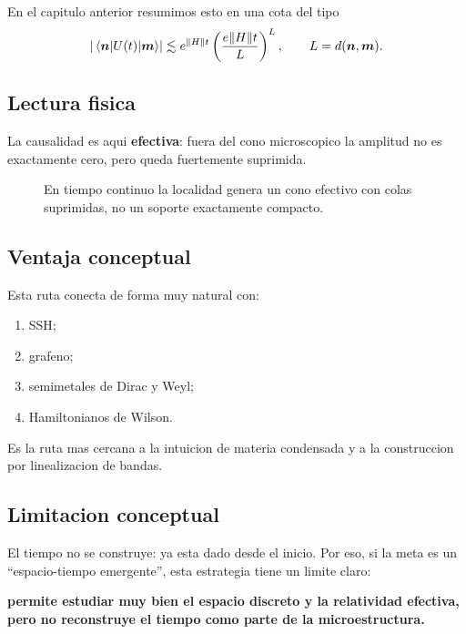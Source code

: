 En el capitulo anterior resumimos esto en una cota del tipo
\begin{equation}
\abs{\mel{\bm{n}}{U(t)}{\bm{m}}}
\lesssim
e^{\norm{H}t}\left(\frac{e\norm{H}t}{L}\right)^L,
\qquad L=d(\bm{n},\bm{m}).
\label{c20:eq:LRped}
\end{equation}

\subsection{Lectura fisica}
La causalidad es aqui \textbf{efectiva}: fuera del cono microscopico la amplitud no es exactamente cero, pero queda fuertemente suprimida.

\begin{figure}[h!]
\centering
{}
\caption{En tiempo continuo la localidad genera un cono efectivo con colas suprimidas, no un soporte exactamente compacto.}
\end{figure}

\subsection{Ventaja conceptual}
Esta ruta conecta de forma muy natural con:
\begin{enumerate}[label=\arabic*.]
    \item SSH;
    \item grafeno;
    \item semimetales de Dirac y Weyl;
    \item Hamiltonianos de Wilson.
\end{enumerate}

Es la ruta mas cercana a la intuicion de materia condensada y a la construccion por linealizacion de bandas.

\subsection{Limitacion conceptual}
El tiempo no se construye: ya esta dado desde el inicio. Por eso, si la meta es un \enquote{espacio-tiempo emergente}, esta estrategia tiene un limite claro:
\begin{displayquote}
\textbf{permite estudiar muy bien el espacio discreto y la relatividad efectiva, pero no reconstruye el tiempo como parte de la microestructura.}
\end{displayquote}

